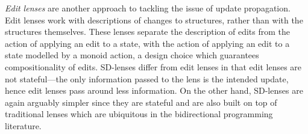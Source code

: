 \documentclass[acmsmall,review,anonymous]{acmart}\settopmatter{printfolios=true,printccs=false,printacmref=false}
\begin{document}
{\em Edit lenses} \cite{hofmann2012edit} are another approach to tackling the
issue of update propagation. Edit lenses work with descriptions of changes to
structures, rather than with the structures themselves. These lenses separate
the description of edits from the action of applying an edit to a state, with
the action of applying an edit to a state modelled by a monoid action, a design
choice which guarantees compositionality of edits. SD-lenses differ from edit
lenses in that edit lenses are not stateful---the only information passed to the
lens is the intended update, hence edit lenses pass around less information. On
the other hand, SD-lenses are again arguably simpler since they are stateful
and are also built on top of traditional lenses which are ubiquitous in the
bidirectional programming literature.



\end{document}
